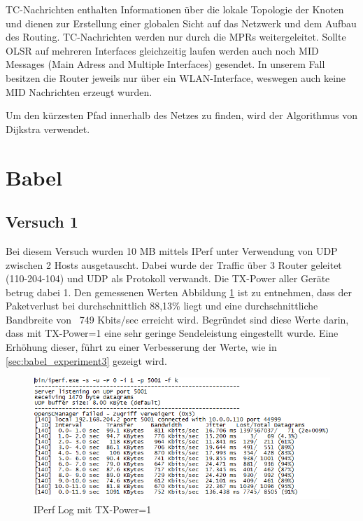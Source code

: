 \documentclass[10pt]{scrartcl}
\begin{document}
TC-Nachrichten enthalten Informationen über die lokale Topologie der Knoten und dienen zur Erstellung einer globalen Sicht auf das Netzwerk und dem Aufbau des Routing. TC-Nachrichten werden nur durch die MPRs weitergeleitet.
Sollte OLSR auf mehreren Interfaces gleichzeitig laufen werden auch noch MID Messages (Main Adress and Multiple Interfaces) gesendet. In unserem Fall besitzen die Router jeweils nur über ein WLAN-Interface, weswegen auch keine MID Nachrichten erzeugt wurden.

Um den kürzesten Pfad innerhalb des Netzes zu finden, wird der Algorithmus von Dijkstra verwendet.
    
    
    
\section{Babel}
	\subsection{Versuch 1}\label{sec:babel_experiment1}
	Bei diesem Versuch wurden 10 MB mittels IPerf  unter Verwendung von UDP zwischen 2 Hosts ausgetauscht. Dabei wurde der Traffic über 3 Router geleitet (110-204-104) und UDP als Protokoll verwandt. Die TX-Power aller Geräte betrug dabei 1. 
Den gemessenen Werten Abbildung \ref{img:babel_iperf_tx1} ist zu entnehmen, dass der Paketverlust bei durchschnittlich 88,13\% liegt und eine durchschnittliche Bandbreite von ~749 Kbits/sec erreicht wird.
Begründet sind diese Werte darin, dass mit TX-Power=1 eine sehr geringe Sendeleistung eingestellt wurde. Eine Erhöhung dieser, führt zu einer Verbesserung der Werte, wie in \ref{sec:babel_experiment3} gezeigt wird.

	\begin{figure}[H]
        \centering
                \includegraphics[width=\textwidth]{img/Babel_TX1_Protokoll}
        \caption{IPerf Log mit TX-Power=1}
        \label{img:babel_iperf_tx1}
	\end{figure}
	
\end{document}
